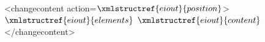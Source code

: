 <changecontent action=$\xmlstructref{eiout}{position}$>
  $\xmlstructref{eiout}{elements}$
  $\xmlstructref{eiout}{content}$
</changecontent>
